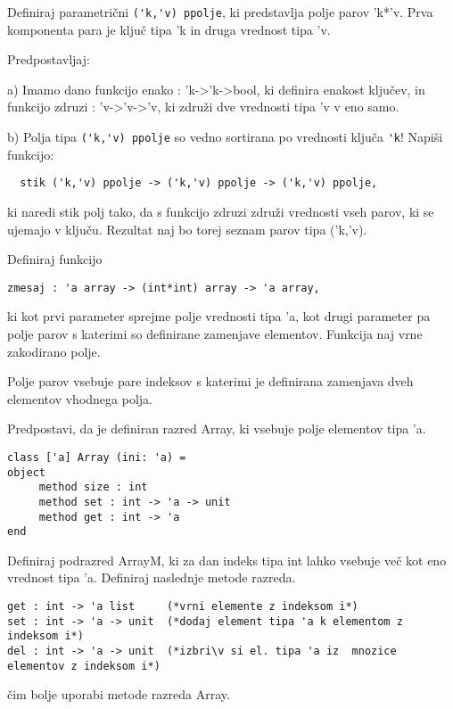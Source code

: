 \begin{ex}
  Definiraj parametri\v cni \lstinline{('k,'v) ppolje}, ki predstavlja
  polje parov 'k*'v. Prva komponenta para je klju\v c tipa 'k in druga
  vrednost tipa 'v.

  \noindent\/Predpostavljaj:

  a) Imamo dano funkcijo enako : 'k->'k->bool, ki definira enakost
  klju\v cev, in funkcijo zdruzi : 'v->'v->'v, ki zdru\v zi dve
  vrednosti tipa 'v v eno samo.

  b) Polja tipa \lstinline{('k,'v) ppolje} so vedno sortirana po vrednosti klju\v
  ca \lstinline{'k}!  Napi\v si funkcijo:
\begin{lstlisting}
  stik ('k,'v) ppolje -> ('k,'v) ppolje -> ('k,'v) ppolje,
\end{lstlisting}
  ki naredi stik polj tako, da s funkcijo zdruzi zdru\v zi vrednosti
  vseh parov, ki se ujemajo v klju\v cu. Rezultat naj bo torej seznam
  parov tipa ('k,'v).


\end{ex}
\begin{ex}
Definiraj funkcijo 
\begin{lstlisting}
zmesaj : 'a array -> (int*int) array -> 'a array, 
\end{lstlisting}
ki kot prvi parameter sprejme polje vrednosti tipa 'a, kot drugi parameter pa polje parov s katerimi so definirane zamenjave elementov. Funkcija naj vrne zakodirano polje. 

Polje parov vsebuje pare indeksov s katerimi je definirana zamenjava dveh elementov vhodnega polja. 


\end{ex} 
\begin{ex}
Predpostavi, da je definiran razred Array, ki vsebuje polje elementov tipa 'a. 

\begin{lstlisting}
class ['a] Array (ini: 'a) =
object 
     method size : int
     method set : int -> 'a -> unit
     method get : int -> 'a
end
\end{lstlisting}
Definiraj podrazred ArrayM, ki za dan indeks tipa int lahko vsebuje ve\v c kot eno vrednost tipa 'a.  Definiraj naslednje metode razreda. 
\begin{lstlisting}
get : int -> 'a list     (*vrni elemente z indeksom i*) 
set : int -> 'a -> unit  (*dodaj element tipa 'a k elementom z indeksom i*)
del : int -> 'a -> unit  (*izbri\v si el. tipa 'a iz  mnozice elementov z indeksom i*)
\end{lstlisting}
\v cim bolje uporabi metode razreda Array. 


\end{ex} 

